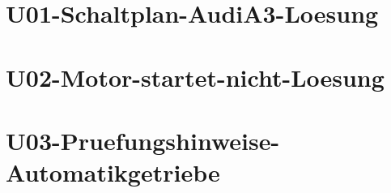 \chapter{U01-Schaltplan-AudiA3-Loesung}
%
\chapter{U02-Motor-startet-nicht-Loesung}
%
\chapter{U03-Pruefungshinweise-Automatikgetriebe}
%



%
%



%



